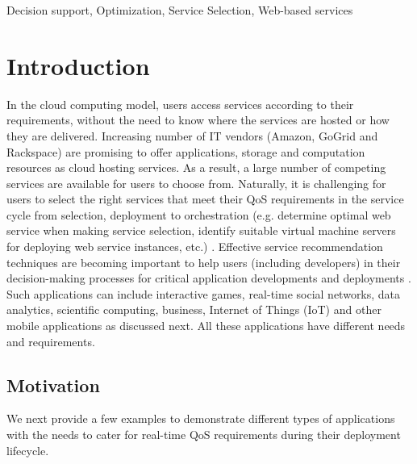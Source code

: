 \documentclass[journal]{IEEEtran}
\begin{document}
\begin{IEEEkeywords}
Decision support, Optimization, Service Selection, Web-based services
\end{IEEEkeywords}

\IEEEpeerreviewmaketitle

\thispagestyle{empty}

\section{Introduction}

In the cloud computing model, users access services according to their requirements, without the need to know where the services are hosted or how they are delivered. Increasing number of IT vendors (Amazon, GoGrid and Rackspace) are promising to offer applications, storage and computation resources as cloud hosting services. As a result, a large number of competing services are available for users \cite{ref1} to choose from. Naturally, it is challenging for users to select the right services that meet their QoS requirements in the service cycle from selection, deployment to orchestration (e.g. determine optimal web service when making service selection, identify suitable virtual machine servers for deploying web service instances, etc.) \cite{zhang2012investigating} . Effective service recommendation techniques are becoming important to help users (including developers) in their decision-making processes for critical application developments and deployments \cite{zhang2013investigating}. Such applications can include interactive games, real-time social networks, data analytics, scientific computing, business, Internet of Things (IoT) and other mobile applications as discussed next. All these applications have different needs and requirements.
\subsection{Motivation}
We next provide a few examples to demonstrate different types of applications with the needs to cater for real-time QoS requirements during their deployment lifecycle.
\end{document}
